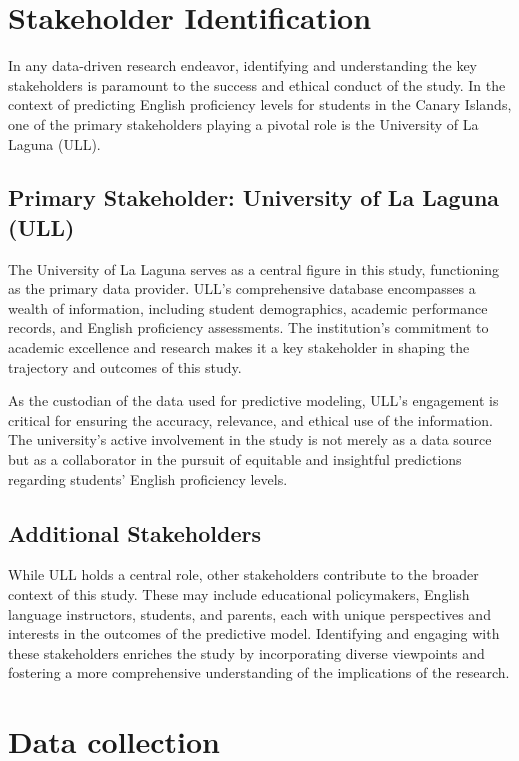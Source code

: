 \documentclass[12pt,a4paper,openright,twoside]{book}
\begin{document}
\section{Stakeholder Identification}

In any data-driven research endeavor, identifying and understanding the key stakeholders is paramount to the success and ethical conduct of the study. In the context of predicting English proficiency levels for students in the Canary Islands, one of the primary stakeholders playing a pivotal role is the University of La Laguna (ULL).

\subsection{Primary Stakeholder: University of La Laguna (ULL)}

The University of La Laguna serves as a central figure in this study, functioning as the primary data provider. ULL's comprehensive database encompasses a wealth of information, including student demographics, academic performance records, and English proficiency assessments. The institution's commitment to academic excellence and research makes it a key stakeholder in shaping the trajectory and outcomes of this study.

As the custodian of the data used for predictive modeling, ULL's engagement is critical for ensuring the accuracy, relevance, and ethical use of the information. The university's active involvement in the study is not merely as a data source but as a collaborator in the pursuit of equitable and insightful predictions regarding students' English proficiency levels.

\subsection{Additional Stakeholders}

While ULL holds a central role, other stakeholders contribute to the broader context of this study. These may include educational policymakers, English language instructors, students, and parents, each with unique perspectives and interests in the outcomes of the predictive model. Identifying and engaging with these stakeholders enriches the study by incorporating diverse viewpoints and fostering a more comprehensive understanding of the implications of the research.

\section{Data collection}
\end{document}
